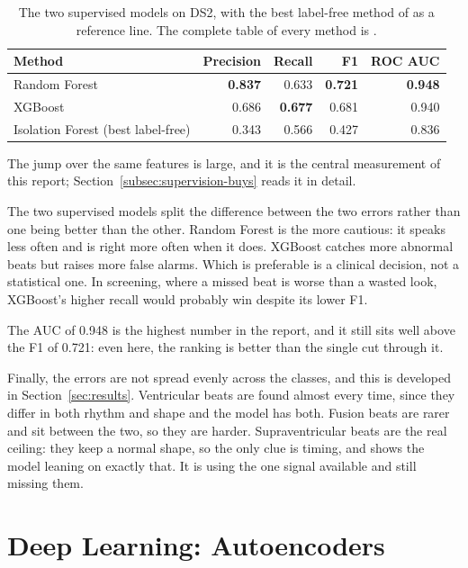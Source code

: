 \documentclass[a4paper, 12pt]{article}
\begin{document}
\begin{table}[htbp]
  \centering
  \small
  \caption{The two supervised models on DS2, with the best label-free method of
   as a reference line. The complete table of every method
  is .}
  \label{tab:supresults}
  \begin{tabular}{@{}lrrrr@{}}
    \toprule
    \textbf{Method} & \textbf{Precision} & \textbf{Recall} & \textbf{F1}
      & \textbf{ROC AUC} \\
    \midrule
    Random Forest        & \textbf{0.837} & 0.633 & \textbf{0.721} & \textbf{0.948} \\
    XGBoost              & 0.686 & \textbf{0.677} & 0.681 & 0.940 \\
    \midrule
    Isolation Forest (best label-free) & 0.343 & 0.566 & 0.427 & 0.836 \\
    \bottomrule
  \end{tabular}
\end{table}

The jump over the same features is large, and it is the central measurement of
this report; Section~\ref{subsec:supervision-buys} reads it in detail.

The two supervised models split the difference between the two errors rather than
one being better than the other. Random Forest is the more cautious: it speaks
less often and is right more often when it does. XGBoost catches more abnormal
beats but raises more false alarms. Which is preferable is a clinical decision,
not a statistical one. In screening, where a missed beat is worse than a wasted
look, XGBoost's higher recall would probably win despite its lower F1.

The AUC of \num{0.948} is the highest number in the report, and it still sits well
above the F1 of \num{0.721}: even here, the ranking is better than the single cut
through it.

Finally, the errors are not spread evenly across the classes, and this is
developed in Section~\ref{sec:results}. Ventricular beats are found almost every
time, since they differ in both rhythm and shape and the model has both. Fusion
beats are rarer and sit between the two, so they are harder. Supraventricular
beats are the real ceiling: they keep a normal shape, so the only clue is timing,
and  shows the model leaning on exactly that. It is using the
one signal available and still missing them.




\section{Deep Learning: Autoencoders} \label{sec:deep}
\end{document}

